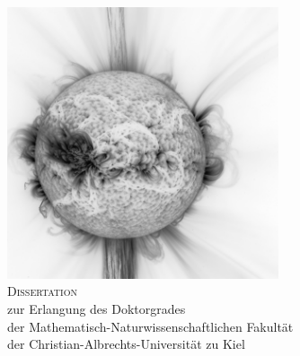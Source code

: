 \begin{titlepage}
\setlength{\hoffset}{0mm}
	\begin{addmargin}[-1cm]{-3cm}
    \begin{center}
        \large  

        \hfill

        \vfill

        \begingroup
            \hrulefill\\
            \vspace{.6cm}
            {\LARGE\myTitle} \\[0.3cm] 
	    	{\Large\mySubtitle} \\ 
        	\vspace{.1cm}
            \hrulefill\\
        \endgroup
	\vspace{1.5cm}
    \includegraphics[width=8cm]{images/invert_SUN.png} \\
	\vspace{1.2cm}
    {\Large\textsc{Dissertation}}\\
	\vspace{.6cm}
        \begingroup
	    zur Erlangung des Doktorgrades\\
	    der Mathematisch-Naturwissenschaftlichen Fakult\"at\\
	    der Christian-Albrechts-Universit\"at zu Kiel
	\vspace{1.2cm}
        \endgroup     


\end{center}
\end{addmargin}
\end{titlepage}
